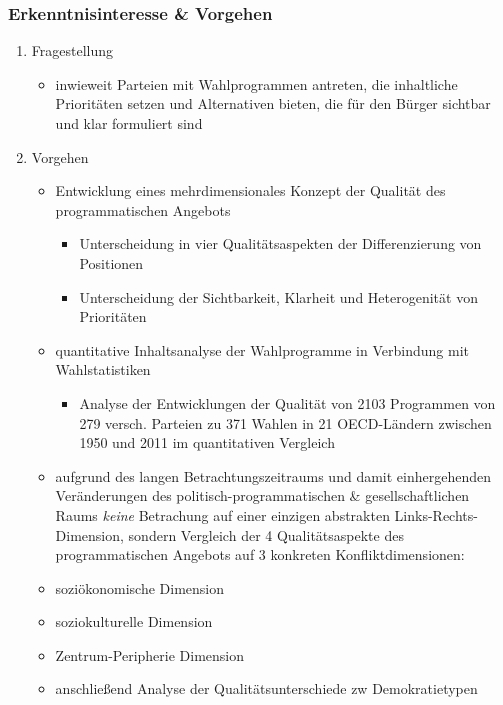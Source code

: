 \documentclass[11pt]{article}
\begin{document}
\subsubsection{Erkenntnisinteresse \& Vorgehen}
\label{sec:org5d3fac5}
\begin{enumerate}
\item Fragestellung
\label{sec:org9ef6ea6}
\begin{itemize}
\item inwieweit Parteien mit Wahlprogrammen antreten, die inhaltliche Prioritäten setzen und Alternativen bieten, die für den Bürger sichtbar und klar formuliert sind
\end{itemize}

\item Vorgehen
\label{sec:org003995b}
\begin{itemize}
\item Entwicklung eines mehrdimensionales Konzept der Qualität des programmatischen Angebots
\begin{itemize}
\item Unterscheidung in vier Qualitätsaspekten der Differenzierung von Positionen
\item Unterscheidung der Sichtbarkeit, Klarheit und Heterogenität von Prioritäten
\end{itemize}
\item quantitative Inhaltsanalyse der Wahlprogramme in Verbindung mit Wahlstatistiken
\begin{itemize}
\item Analyse der Entwicklungen der Qualität von 2103 Programmen von 279 versch. Parteien zu 371 Wahlen in 21 OECD-Ländern zwischen 1950 und 2011 im quantitativen Vergleich
\end{itemize}
\item aufgrund des langen Betrachtungszeitraums und damit einhergehenden Veränderungen des politisch-programmatischen \& gesellschaftlichen Raums \emph{keine} Betrachung auf einer einzigen abstrakten Links-Rechts-Dimension, sondern Vergleich der 4 Qualitätsaspekte des programmatischen Angebots auf 3 konkreten Konfliktdimensionen:
\item soziökonomische Dimension
\item soziokulturelle Dimension
\item Zentrum-Peripherie Dimension

\item anschließend Analyse der Qualitätsunterschiede zw Demokratietypen
\end{itemize}
\end{enumerate}
\end{document}
